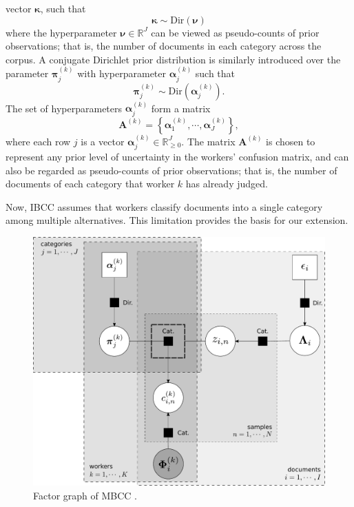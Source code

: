 \documentclass{article}
\begin{document}
vector $\boldsymbol{\kappa}$, such that 
\begin{equation}
\boldsymbol{\kappa}\sim\mbox{Dir}\left(\boldsymbol{\nu}\right)\label{eq:ibcc-kappa|nu}
\end{equation}
where the hyperparameter $\boldsymbol{\nu} \in \mathbb{R}^{J}$ can be viewed as pseudo-counts of prior observations;
that is, the number of documents in each category across the corpus.
A conjugate Dirichlet prior distribution is similarly introduced over
the parameter $\boldsymbol{\pi}_{j}^{(k)}$ with hyperparameter $\boldsymbol{\alpha}_{j}^{(k)}$
such that
\begin{equation}
\boldsymbol{\pi}_{j}^{(k)}\sim\mbox{Dir}\left(\boldsymbol{\alpha}_{j}^{(k)}\right).\label{eq:ibcc_p(pi|)}
\end{equation}
The set of hyperparameters $\boldsymbol{\alpha}_{j}^{(k)}$ form a
matrix 
\[
\mathbf{A}^{(k)}=\left\{ \boldsymbol{\alpha}_{1}^{(k)},\cdots,\boldsymbol{\alpha}_{J}^{(k)}\right\} ,
\]
where each row $j$ is a vector $\boldsymbol{\alpha}_{j}^{(k)} \in \mathbb{R}_{\geq0}^{J}$. The matrix $\mathbf{A}^{(k)}$
is chosen to represent any prior level of uncertainty in the workers'
confusion matrix, and can also be regarded as pseudo-counts of prior
observations; that is, the number of documents of each category that
worker $k$ has already judged. 

Now, IBCC assumes that workers classify documents into a single
category among multiple alternatives. This limitation provides the
basis for our extension.

\begin{figure}[t]
\begin{centering}
\includegraphics[scale=0.25]{res/m-bcc_fg}
\par\end{centering}

\protect\caption[Factor graph of MBCC.]{\label{fig:M-IBCC-FG}Factor graph of MBCC \cite{dietz_directed_2010}.}
\end{figure}
\end{document}
